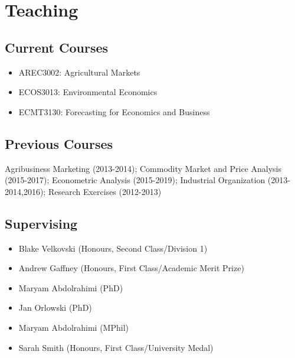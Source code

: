 \documentclass[10pt]{article}
\begin{document}
	\bigskip
	
	\section*{Teaching}
	
	\subsection*{Current Courses}
	\begin{itemize}
		\item {} AREC3002: Agricultural Markets
		\item {} ECOS3013: Environmental Economics
		\item {} ECMT3130: Forecasting for Economics and Business
	\end{itemize}
	
	\subsection*{Previous Courses}	
	Agribusiness Marketing (2013-2014); Commodity Market and Price Analysis (2015-2017); Econometric Analysis (2015-2019); Industrial Organization (2013-2014,2016); Research Exercises (2012-2013)
	
	\subsection*{Supervising}	
	\begin{itemize}
		\item {} Blake Velkovski (Honours, Second Class/Division 1)
		\item {} Andrew Gaffney (Honours, First Class/Academic Merit Prize)
		\item {} Maryam Abdolrahimi (PhD)
		\item {} Jan Orlowski (PhD)
		\item {} Maryam Abdolrahimi (MPhil)
		\item {} Sarah Smith (Honours, First Class/University Medal)
	\end{itemize}
	
\end{document}
